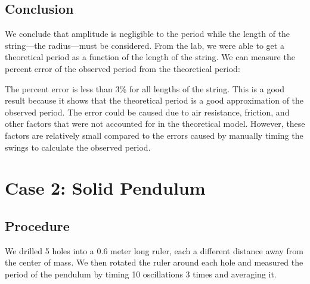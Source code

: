 \documentclass[article, 12pt]{article}
\begin{document}
\subsection{Conclusion}
We conclude that amplitude is negligible to the period while the length of the string---the radius---must be considered. From the lab, we were able to get a theoretical period as a function of the length of the string. We can measure the percent error of the observed period from the theoretical period: 
\begin{table}[H]
    \centering
    \caption{Percent Error of Observed Period from Expected Period}
    \label{tab:percentError}
\end{table}
The percent error is less than 3\% for all lengths of the string. This is a good result because it shows that the theoretical period is a good approximation of the observed period. The error could be caused due to air resistance, friction, and other factors that were not accounted for in the theoretical model. However, these factors are relatively small compared to the errors caused by manually timing the swings to calculate the observed period.
\section{Case 2: Solid Pendulum}
\subsection{Procedure}
We drilled 5 holes into a 0.6 meter long ruler, each a different distance away from the center of mass. We then rotated the ruler around each hole and measured the period of the pendulum by timing 10 oscillations 3 times and averaging it.
\end{document}
